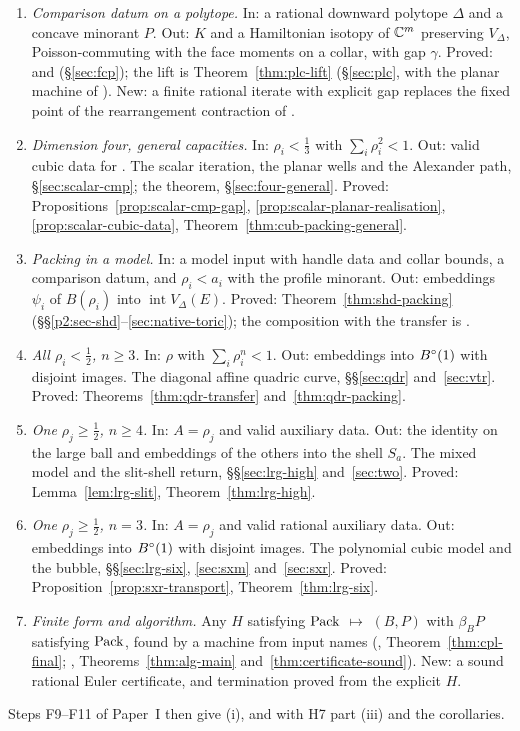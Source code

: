 \label{sec:guide-high}%
\begin{enumerate}[label=\textbf{H\arabic*},leftmargin=*,itemsep=3pt]
\item \emph{Comparison datum on a polytope.} In: a rational downward polytope $\Delta$ and a concave minorant $P$.
 Out: $K$ and a Hamiltonian isotopy of $\mathbb{C}^m$ preserving $V_\Delta$, Poisson-commuting with the face moments on a
 collar, with gap $\gamma$. Proved:  and 
 (\S\ref{sec:fcp}); the lift is Theorem~\ref{thm:plc-lift} (\S\ref{sec:plc}, with the planar machine of
 ). New: a finite rational iterate with explicit gap replaces the fixed point of the rearrangement
 contraction of \cite{OpenAI2026}.
\item \emph{Dimension four, general capacities.} In: $\rho_i<\frac13$ with $\sum_i\rho_i^2<1$. Out: valid cubic data
 for . The scalar iteration, the planar wells and the Alexander path, \S\ref{sec:scalar-cmp};
 the theorem, \S\ref{sec:four-general}. Proved: Propositions~\ref{prop:scalar-cmp-gap}, \ref{prop:scalar-planar-realisation},
 \ref{prop:scalar-cubic-data}, Theorem~\ref{thm:cub-packing-general}.
\item \emph{Packing in a model.} In: a model input with handle data and collar bounds, a comparison datum, and
 $\rho_i<a_i$ with the profile minorant. Out: embeddings $\psi_i$ of $B(\rho_i)$ into $\operatorname{int}V_\Delta(E)$.
 Proved: Theorem~\ref{thm:shd-packing} (\S\S\ref{p2:sec-shd}--\ref{sec:native-toric}); the composition with the
 transfer is .
\item \emph{All $\rho_i<\frac12$, $n\ge3$.} In: $\rho$ with $\sum_i\rho_i^n<1$. Out: embeddings into $B^{\circ}(1)$ with disjoint
 images. The diagonal affine quadric curve, \S\S\ref{sec:qdr} and~\ref{sec:vtr}. Proved: Theorems~\ref{thm:qdr-transfer}
 and~\ref{thm:qdr-packing}.
\item \emph{One $\rho_j\ge\frac12$, $n\ge4$.} In: $A=\rho_j$ and valid auxiliary data. Out: the identity on the large ball
 and embeddings of the others into the shell $S_a$. The mixed model and the slit-shell return, \S\S\ref{sec:lrg-high}
 and~\ref{sec:two}. Proved: Lemma~\ref{lem:lrg-slit}, Theorem~\ref{thm:lrg-high}.
\item \emph{One $\rho_j\ge\frac12$, $n=3$.} In: $A=\rho_j$ and valid rational auxiliary data. Out: embeddings into $B^{\circ}(1)$
 with disjoint images. The polynomial cubic model and the bubble, \S\S\ref{sec:lrg-six}, \ref{sec:sxm}
 and~\ref{sec:sxr}. Proved: Proposition~\ref{prop:sxr-transport}, Theorem~\ref{thm:lrg-six}.
\item \emph{Finite form and algorithm.} Any $H$ satisfying $\mathrm{Pack}$ $\mapsto$ $(B,P)$ with $\beta_BP$ satisfying $\mathrm{Pack}$,
 found by a machine from input names (, Theorem~\ref{thm:cpl-final};
 , Theorems~\ref{thm:alg-main} and~\ref{thm:certificate-sound}). New: a sound rational
 Euler certificate, and termination proved from the explicit $H$.
\end{enumerate}
Steps F9--F11 of Paper~I then give (i), and with H7 part (iii) and the corollaries.
